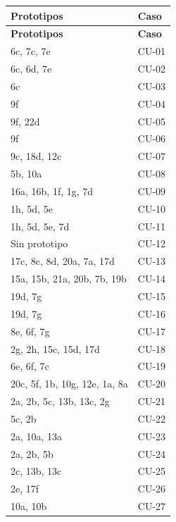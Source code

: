 \begin{center}\small
\begin{longtable}{|L{0.443\textwidth}|L{0.457\textwidth}|}
\hline
\textbf{Prototipos} & \textbf{Caso} \\ \hline
\endfirsthead
\hline
\textbf{Prototipos} & \textbf{Caso} \\ \hline
\endhead
6c, 7c, 7e & \mbox{CU-01} \\ \hline
6c, 6d, 7e & \mbox{CU-02} \\ \hline
6c & \mbox{CU-03} \\ \hline
9f & \mbox{CU-04} \\ \hline
9f, 22d & \mbox{CU-05} \\ \hline
9f & \mbox{CU-06} \\ \hline
9c, 18d, 12c & \mbox{CU-07} \\ \hline
5b, 10a & \mbox{CU-08} \\ \hline
16a, 16b, 1f, 1g, 7d & \mbox{CU-09} \\ \hline
1h, 5d, 5e & \mbox{CU-10} \\ \hline
1h, 5d, 5e, 7d & \mbox{CU-11} \\ \hline
Sin prototipo & \mbox{CU-12} \\ \hline
17c, 8c, 8d, 20a, 7a, 17d & \mbox{CU-13} \\ \hline
15a, 15b, 21a, 20b, 7b, 19b & \mbox{CU-14} \\ \hline
19d, 7g & \mbox{CU-15} \\ \hline
19d, 7g & \mbox{CU-16} \\ \hline
8e, 6f, 7g & \mbox{CU-17} \\ \hline
2g, 2h, 15c, 15d, 17d & \mbox{CU-18} \\ \hline
6e, 6f, 7c & \mbox{CU-19} \\ \hline
20c, 5f, 1b, 10g, 12e, 1a, 8a & \mbox{CU-20} \\ \hline
2a, 2b, 5c, 13b, 13c, 2g & \mbox{CU-21} \\ \hline
5c, 2b & \mbox{CU-22} \\ \hline
2a, 10a, 13a & \mbox{CU-23} \\ \hline
2a, 2b, 5b & \mbox{CU-24} \\ \hline
2c, 13b, 13c & \mbox{CU-25} \\ \hline
2e, 17f & \mbox{CU-26} \\ \hline
10a, 10b & \mbox{CU-27} \\ \hline
\end{longtable}
\end{center}

